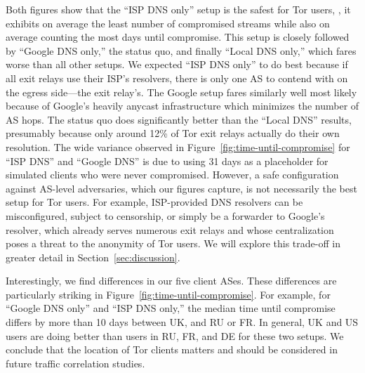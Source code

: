 Both figures show that the ``ISP DNS only'' setup is the safest for Tor users,
\ie, it exhibits on average the least number of compromised streams while also
on average counting the most days until compromise.  This setup is closely
followed by ``Google DNS only,'' the status quo, and finally ``Local DNS only,''
which fares worse than all other setups.  We expected ``ISP DNS only'' to do
best because if all exit relays use their ISP's resolvers, there is only one AS
to contend with on the egress side---the exit relay's.  The Google setup fares
similarly well most likely because of Google's heavily anycast infrastructure
which minimizes the number of AS hops.  The status quo does significantly better
than the ``Local DNS'' results, presumably because only around 12\% of Tor exit
relays actually do their own resolution.  The wide variance observed in
Figure~\ref{fig:time-until-compromise} for ``ISP DNS'' and ``Google DNS'' is due
to using 31 days as a placeholder for simulated clients who were never
compromised.  However, a safe configuration against AS-level adversaries, which
our figures capture, is not necessarily the best setup for Tor users.  For
example, ISP-provided DNS resolvers can be misconfigured, subject to censorship,
or simply be a forwarder to Google's resolver, which already serves numerous
exit relays and whose centralization poses a threat to the anonymity of Tor
users.  We will explore this trade-off in greater detail in
Section~\ref{sec:discussion}.

Interestingly, we find differences in our five client ASes.  These differences
are particularly striking in Figure~\ref{fig:time-until-compromise}.  For
example, for ``Google DNS only'' and ``ISP DNS only,''  the median time until
compromise differs by more than 10 days between UK, and RU or FR.  In general,
UK and US users are doing better than users in RU, FR, and DE for these two
setups.  We conclude that the location of Tor clients matters and should be
considered in future traffic correlation studies.
